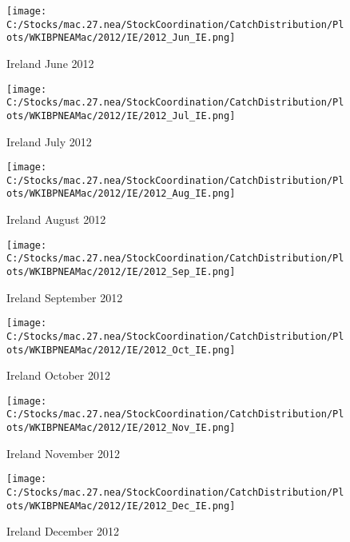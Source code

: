 \documentclass{article}
\begin{document}
\begin{figure}
	\centering
		\texttt{[image: C:/Stocks/mac.27.nea/StockCoordination/CatchDistribution/Plots/WKIBPNEAMac/2012/IE/2012\_Jun\_IE.png]}
	\caption{Ireland June 2012}
	\label{fig:2012_Jun_IE}
\end{figure}

\begin{figure}
	\centering
		\texttt{[image: C:/Stocks/mac.27.nea/StockCoordination/CatchDistribution/Plots/WKIBPNEAMac/2012/IE/2012\_Jul\_IE.png]}
	\caption{Ireland July 2012}
	\label{fig:2012_Jul_IE}
\end{figure}

\begin{figure}
	\centering
		\texttt{[image: C:/Stocks/mac.27.nea/StockCoordination/CatchDistribution/Plots/WKIBPNEAMac/2012/IE/2012\_Aug\_IE.png]}
	\caption{Ireland August 2012}
	\label{fig:2012_Aug_IE}
\end{figure}

\begin{figure}
	\centering
		\texttt{[image: C:/Stocks/mac.27.nea/StockCoordination/CatchDistribution/Plots/WKIBPNEAMac/2012/IE/2012\_Sep\_IE.png]}
	\caption{Ireland September 2012}
	\label{fig:2012_Sep_IE}
\end{figure}

\begin{figure}
	\centering
		\texttt{[image: C:/Stocks/mac.27.nea/StockCoordination/CatchDistribution/Plots/WKIBPNEAMac/2012/IE/2012\_Oct\_IE.png]}
	\caption{Ireland October 2012}
	\label{fig:2012_Oct_IE}
\end{figure}

\begin{figure}
	\centering
		\texttt{[image: C:/Stocks/mac.27.nea/StockCoordination/CatchDistribution/Plots/WKIBPNEAMac/2012/IE/2012\_Nov\_IE.png]}
	\caption{Ireland November 2012}
	\label{fig:2012_Nov_IE}
\end{figure}

\begin{figure}
	\centering
		\texttt{[image: C:/Stocks/mac.27.nea/StockCoordination/CatchDistribution/Plots/WKIBPNEAMac/2012/IE/2012\_Dec\_IE.png]}
	\caption{Ireland December 2012}
	\label{fig:2012_Dec_IE}
\end{figure}

\clearpage

\newpage
\end{document}
